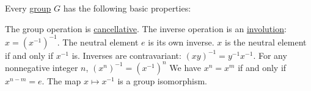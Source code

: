\begin{proposition}\label{thm:def:group}
  Every \hyperref[def:group]{group} \( G \) has the following basic properties:
  \begin{thmenum}
     The group operation is \hyperref[def:binary_operation/cancellative]{cancellative}.
     The inverse operation is an \hyperref[def:set_involution]{involution}: \( x = (x^{-1})^{-1} \).
     The neutral element \( e \) is its own inverse.
     \( x \) is the neutral element if and only if \( x^{-1} \) is.
     Inverses are contravariant: \( (xy)^{-1} = y^{-1} x^{-1} \).
     For any nonnegative integer \( n \), \( (x^n)^{-1} = (x^{-1})^n \)
     We have \( x^n = x^m \) if and only if \( x^{n-m} = e \).
     The map \( x \mapsto x^{-1} \) is a group isomorphism.
  \end{thmenum}
\end{proposition}
